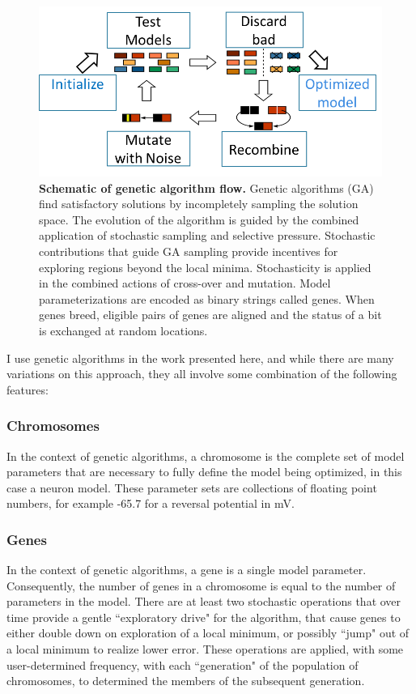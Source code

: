 \begin{figure}
\begin{center}
\includegraphics[width=0.7\linewidth]{figures/GA_process.png}
\caption[Schematic of genetic algorithm flow]{\textbf{Schematic of genetic algorithm flow.} Genetic algorithms (GA) find satisfactory solutions by incompletely sampling the solution space. The evolution of the algorithm is guided by the combined application of stochastic sampling and selective pressure. Stochastic contributions that guide GA sampling provide incentives for exploring regions beyond the local minima. Stochasticity is applied in the combined actions of cross-over and mutation. Model parameterizations are encoded as binary strings called genes. When genes breed, eligible pairs of genes are aligned and the status of a bit is exchanged at random locations.  
}
\label{fig:GeneticAlgOver}
\end{center}
\end{figure}
  
I use genetic algorithms in the work presented here, and while there are many variations on this approach, they all involve some combination of the following features:
\subsubsection{Chromosomes}
In the context of genetic algorithms, a chromosome is the complete set of model parameters that are necessary to fully define the model being optimized, in this case a neuron model.
These parameter sets are collections of floating point numbers, for example -65.7 for a reversal potential in mV.
\subsubsection{Genes}
In the context of genetic algorithms, a gene is a single model parameter.  Consequently, the number of genes in a chromosome is equal to the number of parameters in the model.
There are at least two stochastic operations that over time provide a gentle ``exploratory drive" for the algorithm, that cause genes to either double down on exploration of a local minimum, or possibly ``jump" out of a local minimum to realize lower error.  These operations are applied, with some user-determined frequency, with each ``generation" of the population of chromosomes, to determined the members of the subsequent generation.
